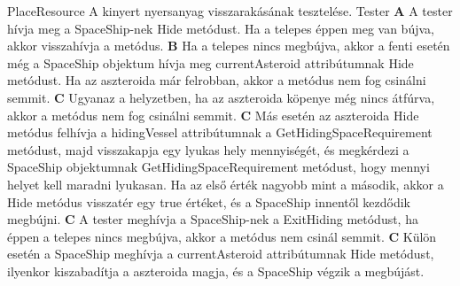 \documentclass[../../projlab]{subfiles}
\begin{document}
\begin{use-case}
    {PlaceResource}
    {A kinyert nyersanyag visszarakásának tesztelése.}
    {Tester} 
    \textbf{A} A tester hívja meg a SpaceShip-nek Hide metódust. Ha a telepes éppen meg van bújva, akkor visszahívja a metódus. \newline
    \textbf{B} Ha a telepes nincs megbújva, akkor a fenti esetén még a SpaceShip objektum hívja meg currentAsteroid attribútumnak Hide metódust. Ha az aszteroida már felrobban, akkor a metódus nem fog csinálni semmit. \newline
    \textbf{C} Ugyanaz a helyzetben, ha az aszteroida köpenye még nincs átfúrva, akkor a metódus nem fog csinálni semmit. \newline
    \textbf{C} Más esetén az aszteroida Hide metódus felhívja a hidingVessel attribútumnak a GetHidingSpaceRequirement metódust, majd visszakapja egy lyukas hely mennyiségét, és megkérdezi a SpaceShip objektumnak GetHidingSpaceRequirement metódust, hogy mennyi helyet kell maradni lyukasan. Ha az első érték nagyobb mint a második, akkor a Hide metódus visszatér egy true értéket, és a SpaceShip innentől kezdődik megbújni. \newline
    \textbf{C} A tester meghívja a SpaceShip-nek a ExitHiding metódust, ha éppen a telepes nincs megbújva, akkor a metódus nem csinál semmit. \newline
    \textbf{C} Külön esetén a SpaceShip meghívja a currentAsteroid attribútumnak Hide metódust, ilyenkor kiszabadítja a aszteroida magja, és a SpaceShip végzik a megbújást. \newline
\end{use-case}
\end{document}
